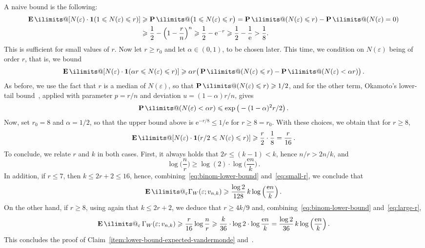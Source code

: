 \documentclass[11pt, letterpaper, hidelinks]{article}
\makeatletter
\newcommand{\e}{\mathrm{e}}
\newcommand{\1}{\mathbf 1}
\newcommand{\eps}{\varepsilon}
\renewcommand{\leq}{\leqslant}
\renewcommand{\geq}{\geqslant}
\newcommand{\E}{\operatorname*{\mathbf{E}}\ilimits@}
\renewcommand{\P}{\operatorname*{\mathbf{P}}\ilimits@}
\theoremstyle{plain}
\theoremstyle{definition}
\makeatother
\begin{document}
A naive bound is the following:
\begin{align}
\E[N(\eps) \cdot \1(1 \leq N(\eps) \leq r) ]
	&\geq \P\big(1 \leq N(\eps) \leq r\big)
	= \P(N(\eps) \leq r) - \P(N(\eps) = 0)  \\
	&\geq \frac{1}{2} - \Big(1 - \frac{r}{n}\Big)^n
	\geq \frac{1}{2} - \e^{-r} \geq \frac{1}{2} - \frac{1}{\e} > \frac{1}{8}. \label{eq:small-r}
\end{align}
This is sufficient for small values of $r$. Now let $r\geq r_0$ and let $\alpha \in (0,1)$, to be chosen later. This time, we condition on $N(\eps)$ being of order $r$, that is, we bound
\begin{equation}
\E[N(\eps) \cdot \1(\alpha r \leq N(\eps) \leq r)]
	\geq \alpha r \big( \P( N(\eps) \leq r ) - \P( N(\eps) < \alpha r) \big) \, .
\end{equation}
As before, we use the fact that $r$ is a median of $N(\eps)$, so that $\P( N(\eps) \leq r ) \geq 1/2$, and for the other term, Okamoto's lower-tail bound~\cite[Theorem~2]{okamoto1958binom}, applied with parameter $p=r/n$ and deviation $u=(1-\alpha)r/n$, gives
\begin{equation}
	\P(N(\eps) < \alpha r ) \leq \exp\big(- (1-\alpha)^2 r/2\big) \, .
\end{equation}
Now, set $r_0=8$ and $\alpha = 1/2$, so that the upper bound above is $\e^{-r/8} \leq 1/\e$ for $r\geq 8 = r_0$. With these choices, we obtain that for $r\geq 8$,
\begin{equation}
\label{eq:large-r}
\E[N(\eps) \cdot \1(r/2 \leq N(\eps) \leq r)]
	\geq \frac r 2 \cdot \frac 1 8 = \frac r {16} \, .
\end{equation}
To conclude, we relate $r$ and $k$ in both cases. First, it always holds that $2r \leq (k-1) <k$, hence $n/r > 2n/k$, and
\begin{equation}
\log\Big(\frac n r \Big) \geq \log(2) \cdot \log\Big(\frac{\e n}{k} \Big)\, .
\end{equation}
In addition, if $r \leq 7$, then $k \leq 2r + 2 \leq 16$, hence, combining~\eqref{eq:binom-lower-bound} and~\eqref{eq:small-r}, we conclude that 
\begin{equation}
\E_\eps \Gamma_W(\eps; v_{n,k}) \geq \frac{\log 2}{128} \,  k \log\Big(\frac{\e n}{k}\Big) \, .
\end{equation}
On the other hand, if $r\geq 8$, using again that $k \leq 2r + 2$, we deduce that $r \geq 4k/9$ and, combining~\eqref{eq:binom-lower-bound} and~\eqref{eq:large-r},
\begin{equation}
\E_\eps\, \Gamma_W(\eps; v_{n,k})
	\geq \frac{r}{16} \log\frac{n}{r}
	\geq \frac{k}{36}\cdot\log 2\cdot\log\frac{\e n}{k} = \frac{\log 2}{36}\, k\log\Big(\frac{\e n}{k}\Big) \, .
\end{equation}
This concludes the proof of Claim~\ref{item:lower-bound-expected-vandermonde} and~.
\end{document}
